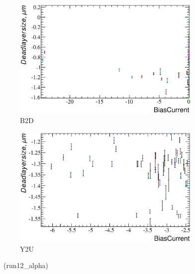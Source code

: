 \documentclass[a4paper,12pt]{article}
\begin{document}
\begin{figure}[h]
\begin{subfigure}[b]{0.5\textwidth}
\includegraphics[width=\textwidth]{gfx/run12_alpha/B2D/c_hBiasCurrent_DeadLayerSize.eps}
\caption{B2D}
\end{subfigure}
\begin{subfigure}[b]{0.5\textwidth}
\includegraphics[width=\textwidth]{gfx/run12_alpha/Y2U/c_hBiasCurrent_DeadLayerSize.eps}
\caption{Y2U}
\end{subfigure}
\caption{\bcvsxdllabel\ (run12\_alpha)}
\end{figure}
\end{document}
